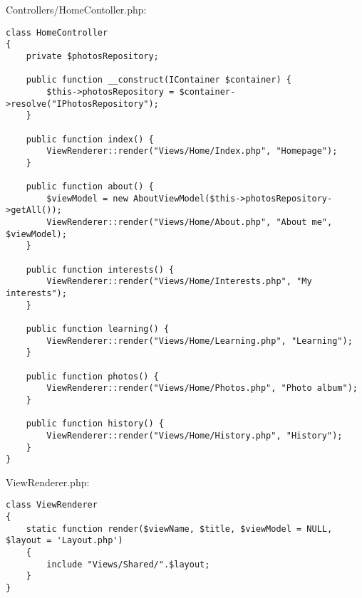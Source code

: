 \documentclass[a4paper,14pt]{extarticle}
\begin{document}
Controllers/HomeContoller.php:
\begin{lstlisting}
class HomeController
{
    private $photosRepository;

    public function __construct(IContainer $container) {
        $this->photosRepository = $container->resolve("IPhotosRepository");
    }

    public function index() {
        ViewRenderer::render("Views/Home/Index.php", "Homepage");
    }

    public function about() {
        $viewModel = new AboutViewModel($this->photosRepository->getAll());
        ViewRenderer::render("Views/Home/About.php", "About me", $viewModel);
    }

    public function interests() {
        ViewRenderer::render("Views/Home/Interests.php", "My interests");
    }

    public function learning() {
        ViewRenderer::render("Views/Home/Learning.php", "Learning");
    }

    public function photos() {
        ViewRenderer::render("Views/Home/Photos.php", "Photo album");
    }

    public function history() {
        ViewRenderer::render("Views/Home/History.php", "History");
    }
}
\end{lstlisting}

ViewRenderer.php:
\begin{lstlisting}
class ViewRenderer
{
    static function render($viewName, $title, $viewModel = NULL, $layout = 'Layout.php')
    {
        include "Views/Shared/".$layout;
    }
}
\end{lstlisting}
\end{document}
